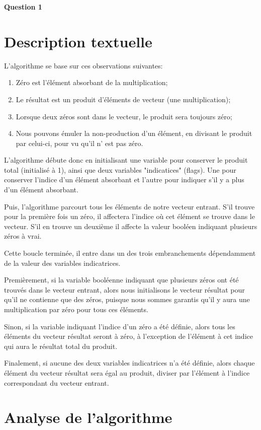 \documentclass[class=article]{standalone}
\begin{document}
\centerline{\Huge \bf Question 1}
\bigskip
\section*{Description textuelle}

L'algorithme se base sur ces observations suivantes:
\begin{enumerate}
    \item Zéro est l'élément absorbant de la multiplication;
    \item Le résultat est un produit d'éléments de vecteur (une multiplication);
    \item Lorsque deux zéros sont dans le vecteur, le produit sera toujours zéro;
    \item Nous pouvons émuler la non-production d'un élément, en divisant le produit par celui-ci, pour vu qu'il n’ est pas zéro.
\end{enumerate}

L'algorithme débute donc en initialisant une variable pour conserver le produit total (initialisé à 1), 
ainsi que deux variables "indicatices" (flags). Une pour conserver l'indice d'un élément absorbant et l'autre pour indiquer s'il y a plus d'un élément absorbant.

Puis, l'algorithme parcourt tous les éléments de notre vecteur entrant. S'il trouve pour la première fois un zéro, il affectera l'indice
où cet élément se trouve dans le vecteur. S'il en trouve un deuxième il affecte la valeur booléen indiquant plusieurs zéros à vrai. 

Cette boucle terminée, il entre dans un des trois embranchements dépendamment de la valeur des variables indicatrices.

Premièrement, si la variable booléenne indiquant que plusieurs zéros ont été trouvés dans le vecteur entrant,
alors nous initialisons le vecteur résultat pour qu'il ne contienne que des zéros, puisque nous sommes garantis qu'il 
y aura une multiplication par zéro pour tous ces éléments. 

Sinon, si la variable indiquant l'indice d'un zéro a été définie, alors tous les éléments du vecteur résultat seront
à zéro, à l'exception de l'élément à cet indice qui aura le résultat total du produit.

Finalement, si aucune des deux variables indicatrices n'a été définie, alors chaque élément du vecteur résultat sera égal au produit, diviser par 
l'élément à l'indice correspondant du vecteur entrant.

\section*{Analyse de l'algorithme}
\end{document}
